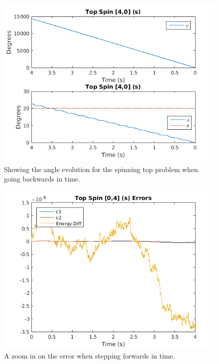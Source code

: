 \documentclass[11pt]{article}
\begin{document}
\begin{figure}[H]
	\centering
	\includegraphics[width=1\textwidth]{../ex2/plots/backwardData.png}
	\caption{Showing the angle evolution for the spinning top problem when going backwards in time.}
	\label{fig:backwardData}
\end{figure}

\begin{figure}[H]
	\centering
	\includegraphics[width=1\textwidth]{../ex2/plots/forwardDataError.png}
	\caption{A zoom in on the error when stepping forwards in time.}
	\label{fig:forwardDataError}
\end{figure}
\end{document}
